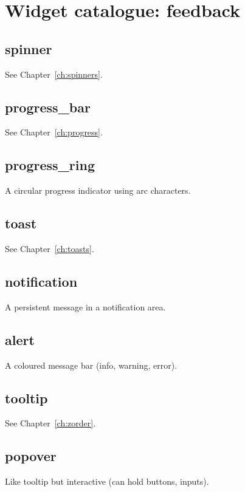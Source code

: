 \chapter{Widget catalogue: feedback}
\label{ch:catalogue_feedback}

\section{spinner}

See Chapter~\ref{ch:spinners}.

\section{progress\_bar}

See Chapter~\ref{ch:progress}.

\section{progress\_ring}

A circular progress indicator using arc characters.

\section{toast}

See Chapter~\ref{ch:toasts}.

\section{notification}

A persistent message in a notification area.

\section{alert}

A coloured message bar (info, warning, error).

\section{tooltip}

See Chapter~\ref{ch:zorder}.

\section{popover}

Like tooltip but interactive (can hold buttons, inputs).

